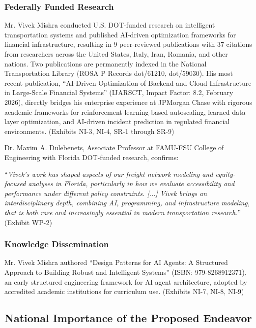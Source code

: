 \documentclass[11pt]{article}
\newcommand{\say}[1]{``#1''}
\newcommand{\dr}{Mr. Vivek Mishra }
\newcommand{\qu}[1]{\say{\emph{#1}}}
\begin{document}
\subsubsection{Federally Funded Research}

\dr conducted U.S. DOT-funded research on intelligent transportation systems and published AI-driven optimization frameworks for financial infrastructure, resulting in 9 peer-reviewed publications with 37 citations from researchers across the United States, Italy, Iran, Romania, and other nations. Two publications are permanently indexed in the National Transportation Library (ROSA P Records dot/61210, dot/59030). His most recent publication, ``AI-Driven Optimization of Backend and Cloud Infrastructure in Large-Scale Financial Systems'' (IJARSCT, Impact Factor: 8.2, February 2026), directly bridges his enterprise experience at JPMorgan Chase with rigorous academic frameworks for reinforcement learning-based autoscaling, learned data layer optimization, and AI-driven incident prediction in regulated financial environments. (Exhibits NI-3, NI-4, SR-1 through SR-9)

Dr. Maxim A. Dulebenets, Associate Professor at FAMU-FSU College of Engineering with Florida DOT-funded research, confirms:

\qu{Vivek's work has shaped aspects of our freight network modeling and equity-focused analyses in Florida, particularly in how we evaluate accessibility and performance under different policy constraints. [...] Vivek brings an interdisciplinary depth, combining AI, programming, and infrastructure modeling, that is both rare and increasingly essential in modern transportation research.} (Exhibit WP-2)

\subsubsection{Knowledge Dissemination}

\dr authored ``Design Patterns for AI Agents: A Structured Approach to Building Robust and Intelligent Systems'' (ISBN: 979-8268912371), an early structured engineering framework for AI agent architecture, adopted by accredited academic institutions for curriculum use. (Exhibits NI-7, NI-8, NI-9)

\subsection{National Importance of the Proposed Endeavor}
\end{document}
